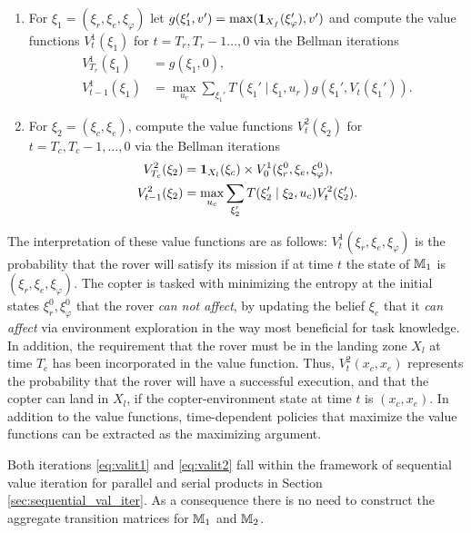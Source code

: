 \documentclass[conference]{IEEEtran}
\begin{document}
\begin{enumerate}
  \item For $\xi_1 = (\xi_r, \xi_e, \xi_\varphi)$ let $g(\xi_1', v') = \max( \mathbf{1}_{X_f}(\xi_\varphi'), v' )$ and compute the value functions $V^1_t(\xi_1)$ for $t = T_r, T_r-1 \ldots, 0$ via the Bellman iterations
  \begin{equation}
  \label{eq:valit1}
  \begin{aligned}
      V^1_{T_r}(\xi_1) & = g(\xi_1, 0), \\
      V^1_{t-1} (\xi_1) & = \max_{u_r} \sum_{\xi_1'} T(\xi_1' \mid \xi_1, u_r) g(\xi_1', V_t(\xi_1')).
  \end{aligned}
  \end{equation} 
  \item For $\xi_2 = (\xi_c, \xi_e)$, compute the value functions $V^2_t(\xi_2)$ for $t = T_c, T_c-1, \ldots, 0$ via the Bellman iterations
  \begin{equation}
  \label{eq:valit2}
  \begin{aligned}
    V_{T_c}^2(\xi_2) & = \ind_{X_l} (\xi_c) \times V^1_0(\xi_r^0, \xi_e, \xi_\varphi^0), \\
    V_{t-1}^2(\xi_2) & = \max_{u_c} \sum_{\xi_2'} T(\xi_2' \mid \xi_2, u_c) V^2_t(\xi_2').
  \end{aligned}
  \end{equation}
\end{enumerate}
The interpretation of these value functions are as follows: $V_t^1(\xi_r, \xi_e, \xi_\varphi)$ is the probability that the rover will satisfy its mission if at time $t$ the state of $\mathbb{M}_1$ is $(\xi_r, \xi_e, \xi_\varphi)$. The copter is tasked with minimizing the entropy at the initial states $\xi_r^0, \xi_\varphi^0$ that the rover \emph{can not affect}, by updating the belief $\xi_e$ that it \emph{can affect} via environment exploration in the way most beneficial for task knowledge. In addition, the requirement that the rover must be in the landing zone $X_l$ at time $T_c$ has been incorporated in the value function. Thus, $V_t^2(x_c, x_e)$ represents the probability that the rover will have a successful execution, and that the copter can land in $X_l$, if the copter-environment state at time $t$ is $(x_c, x_e)$. In addition to the value functions, time-dependent policies that maximize the value functions can be extracted as the maximizing argument.

Both iterations \eqref{eq:valit1} and \eqref{eq:valit2} fall within the framework of sequential value iteration for parallel and serial products in Section \ref{sec:sequential_val_iter}. As a consequence there is no need to construct the aggregate transition matrices for $\mathbb{M}_1$ and $\mathbb{M}_2$.
\end{document}
